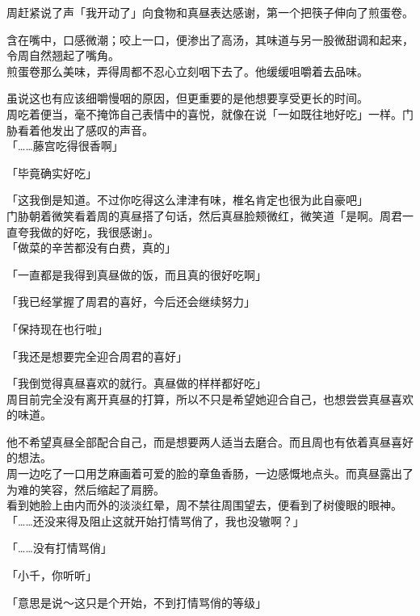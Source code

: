 周赶紧说了声「我开动了」向食物和真昼表达感谢，第一个把筷子伸向了煎蛋卷。

含在嘴中，口感微潮；咬上一口，便渗出了高汤，其味道与另一股微甜调和起来，令周自然翘起了嘴角。\\

煎蛋卷那么美味，弄得周都不忍心立刻咽下去了。他缓缓咀嚼着去品味。

虽说这也有应该细嚼慢咽的原因，但更重要的是他想要享受更长的时间。\\

周吃着便当，毫不掩饰自己表情中的喜悦，就像在说「一如既往地好吃」一样。门胁看着他发出了感叹的声音。\\

「……藤宫吃得很香啊」

「毕竟确实好吃」

「这我倒是知道。不过你吃得这么津津有味，椎名肯定也很为此自豪吧」\\

门胁朝着微笑看着周的真昼搭了句话，然后真昼脸颊微红，微笑道「是啊。周君一直夸我做的好吃，我很感谢」。\\

「做菜的辛苦都没有白费，真的」

「一直都是我得到真昼做的饭，而且真的很好吃啊」

「我已经掌握了周君的喜好，今后还会继续努力」

「保持现在也行啦」

「我还是想要完全迎合周君的喜好」

「我倒觉得真昼喜欢的就行。真昼做的样样都好吃」\\

周目前完全没有离开真昼的打算，所以不只是希望她迎合自己，也想尝尝真昼喜欢的味道。

他不希望真昼全部配合自己，而是想要两人适当去磨合。而且周也有依着真昼喜好的想法。\\

周一边吃了一口用芝麻画着可爱的脸的章鱼香肠，一边感慨地点头。而真昼露出了为难的笑容，然后缩起了肩膀。\\

看到她脸上由内而外的淡淡红晕，周不禁往周围望去，便看到了树傻眼的眼神。\\

「……还没来得及阻止这就开始打情骂俏了，我也没辙啊？」

「……没有打情骂俏」

「小千，你听听」

「意思是说～这只是个开始，不到打情骂俏的等级」

